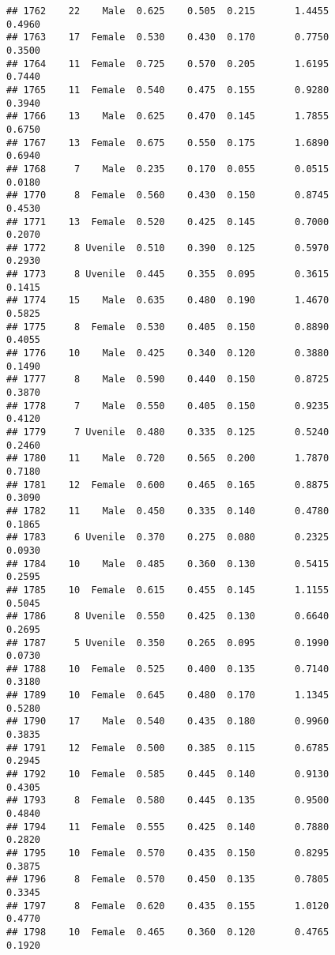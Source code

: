\documentclass[
]{article}
\begin{document}
\begin{verbatim}
## 1762    22    Male  0.625    0.505  0.215       1.4455         0.4960
## 1763    17  Female  0.530    0.430  0.170       0.7750         0.3500
## 1764    11  Female  0.725    0.570  0.205       1.6195         0.7440
## 1765    11  Female  0.540    0.475  0.155       0.9280         0.3940
## 1766    13    Male  0.625    0.470  0.145       1.7855         0.6750
## 1767    13  Female  0.675    0.550  0.175       1.6890         0.6940
## 1768     7    Male  0.235    0.170  0.055       0.0515         0.0180
## 1770     8  Female  0.560    0.430  0.150       0.8745         0.4530
## 1771    13  Female  0.520    0.425  0.145       0.7000         0.2070
## 1772     8 Uvenile  0.510    0.390  0.125       0.5970         0.2930
## 1773     8 Uvenile  0.445    0.355  0.095       0.3615         0.1415
## 1774    15    Male  0.635    0.480  0.190       1.4670         0.5825
## 1775     8  Female  0.530    0.405  0.150       0.8890         0.4055
## 1776    10    Male  0.425    0.340  0.120       0.3880         0.1490
## 1777     8    Male  0.590    0.440  0.150       0.8725         0.3870
## 1778     7    Male  0.550    0.405  0.150       0.9235         0.4120
## 1779     7 Uvenile  0.480    0.335  0.125       0.5240         0.2460
## 1780    11    Male  0.720    0.565  0.200       1.7870         0.7180
## 1781    12  Female  0.600    0.465  0.165       0.8875         0.3090
## 1782    11    Male  0.450    0.335  0.140       0.4780         0.1865
## 1783     6 Uvenile  0.370    0.275  0.080       0.2325         0.0930
## 1784    10    Male  0.485    0.360  0.130       0.5415         0.2595
## 1785    10  Female  0.615    0.455  0.145       1.1155         0.5045
## 1786     8 Uvenile  0.550    0.425  0.130       0.6640         0.2695
## 1787     5 Uvenile  0.350    0.265  0.095       0.1990         0.0730
## 1788    10  Female  0.525    0.400  0.135       0.7140         0.3180
## 1789    10  Female  0.645    0.480  0.170       1.1345         0.5280
## 1790    17    Male  0.540    0.435  0.180       0.9960         0.3835
## 1791    12  Female  0.500    0.385  0.115       0.6785         0.2945
## 1792    10  Female  0.585    0.445  0.140       0.9130         0.4305
## 1793     8  Female  0.580    0.445  0.135       0.9500         0.4840
## 1794    11  Female  0.555    0.425  0.140       0.7880         0.2820
## 1795    10  Female  0.570    0.435  0.150       0.8295         0.3875
## 1796     8  Female  0.570    0.450  0.135       0.7805         0.3345
## 1797     8  Female  0.620    0.435  0.155       1.0120         0.4770
## 1798    10  Female  0.465    0.360  0.120       0.4765         0.1920

\end{verbatim}
\end{document}
